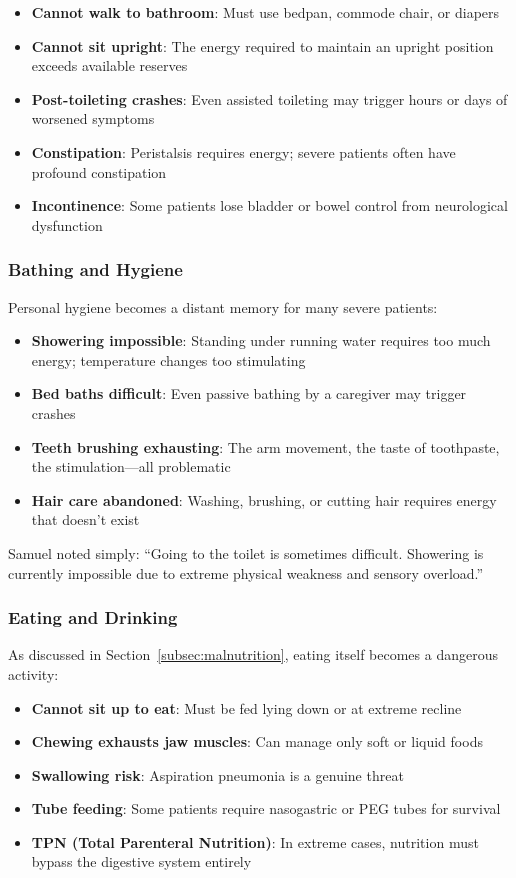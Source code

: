 \begin{itemize}
    \item \textbf{Cannot walk to bathroom}: Must use bedpan, commode chair, or diapers
    \item \textbf{Cannot sit upright}: The energy required to maintain an upright position exceeds available reserves
    \item \textbf{Post-toileting crashes}: Even assisted toileting may trigger hours or days of worsened symptoms
    \item \textbf{Constipation}: Peristalsis requires energy; severe patients often have profound constipation
    \item \textbf{Incontinence}: Some patients lose bladder or bowel control from neurological dysfunction
\end{itemize}

\subsubsection{Bathing and Hygiene}

Personal hygiene becomes a distant memory for many severe patients:

\begin{itemize}
    \item \textbf{Showering impossible}: Standing under running water requires too much energy; temperature changes too stimulating
    \item \textbf{Bed baths difficult}: Even passive bathing by a caregiver may trigger crashes
    \item \textbf{Teeth brushing exhausting}: The arm movement, the taste of toothpaste, the stimulation---all problematic
    \item \textbf{Hair care abandoned}: Washing, brushing, or cutting hair requires energy that doesn't exist
\end{itemize}

Samuel noted simply: ``Going to the toilet is sometimes difficult. Showering is currently impossible due to extreme physical weakness and sensory overload.''

\subsubsection{Eating and Drinking}

As discussed in Section~\ref{subsec:malnutrition}, eating itself becomes a dangerous activity:

\begin{itemize}
    \item \textbf{Cannot sit up to eat}: Must be fed lying down or at extreme recline
    \item \textbf{Chewing exhausts jaw muscles}: Can manage only soft or liquid foods
    \item \textbf{Swallowing risk}: Aspiration pneumonia is a genuine threat
    \item \textbf{Tube feeding}: Some patients require nasogastric or PEG tubes for survival
    \item \textbf{TPN (Total Parenteral Nutrition)}: In extreme cases, nutrition must bypass the digestive system entirely
\end{itemize}

